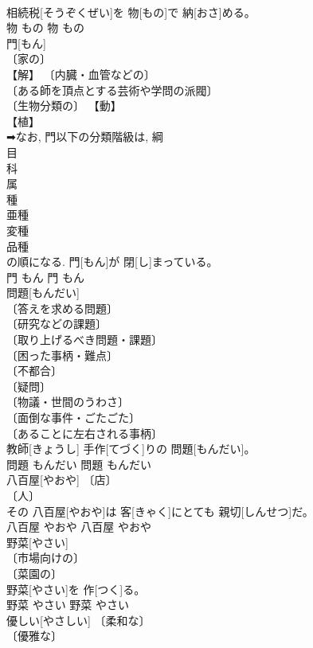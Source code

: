 \documentclass[8pt]{extreport}
\begin{document}
\begin{CJK}{UTF8}{min}
\\	相続税[そうぞくぜい]を 物[もの]で 納[おさ]める。	
\\	物	もの	物	もの	
\\	門[もん]	
\\	〔家の〕 
\\	【解】 〔内臓・血管などの〕 
\\	〔ある師を頂点とする芸術や学問の派閥〕 
\\	〔生物分類の〕 【動】 
\\	【植】 
\\	➡なお, 門以下の分類階級は, 綱 
\\	目 
\\	科 
\\	属 
\\	種 
\\	亜種 
\\	変種 
\\	品種 
\\	の順になる.	門[もん]が 閉[し]まっている。	
\\	門	もん	門	もん	
\\	問題[もんだい]	
\\	〔答えを求める問題〕 
\\	〔研究などの課題〕 
\\	〔取り上げるべき問題・課題〕 
\\	〔困った事柄・難点〕 
\\	〔不都合〕 
\\	〔疑問〕 
\\	〔物議・世間のうわさ〕 
\\	〔面倒な事件・ごたごた〕 
\\	〔あることに左右される事柄〕 
\\	教師[きょうし] 手作[てづく]りの 問題[もんだい]。	
\\	問題	もんだい	問題	もんだい	
\\	八百屋[やおや]	〔店〕 
\\	〔人〕 
\\	その 八百屋[やおや]は 客[きゃく]にとても 親切[しんせつ]だ。	
\\	八百屋	やおや	八百屋	やおや	
\\	野菜[やさい]	
\\	〔市場向けの〕 
\\	〔菜園の〕 
\\	野菜[やさい]を 作[つく]る。	
\\	野菜	やさい	野菜	やさい	
\\	優しい[やさしい]	〔柔和な〕 
\\	〔優雅な〕 

\end{CJK}
\end{document}
